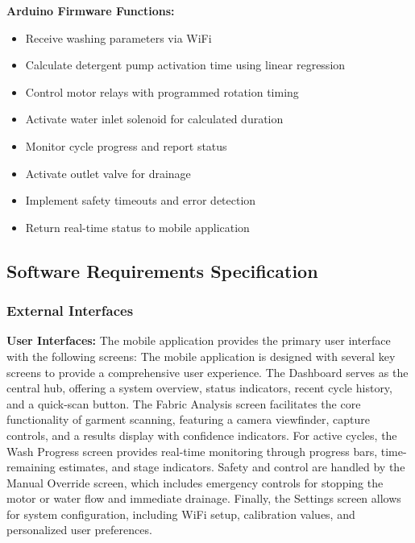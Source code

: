 \textbf{Arduino Firmware Functions:}
\begin{itemize}
    \item Receive washing parameters via WiFi
    \item Calculate detergent pump activation time using linear regression
    \item Control motor relays with programmed rotation timing
    \item Activate water inlet solenoid for calculated duration
    \item Monitor cycle progress and report status
    \item Activate outlet valve for drainage
    \item Implement safety timeouts and error detection
    \item Return real-time status to mobile application
\end{itemize}

\subsection{Software Requirements Specification}

\subsubsection{External Interfaces}
\textbf{User Interfaces:}
The mobile application provides the primary user interface with the following screens:
The mobile application is designed with several key screens to provide a comprehensive user experience. The Dashboard serves as the central hub, offering a system overview, status indicators, recent cycle history, and a quick-scan button. The Fabric Analysis screen facilitates the core functionality of garment scanning, featuring a camera viewfinder, capture controls, and a results display with confidence indicators. For active cycles, the Wash Progress screen provides real-time monitoring through progress bars, time-remaining estimates, and stage indicators. Safety and control are handled by the Manual Override screen, which includes emergency controls for stopping the motor or water flow and immediate drainage. Finally, the Settings screen allows for system configuration, including WiFi setup, calibration values, and personalized user preferences.

